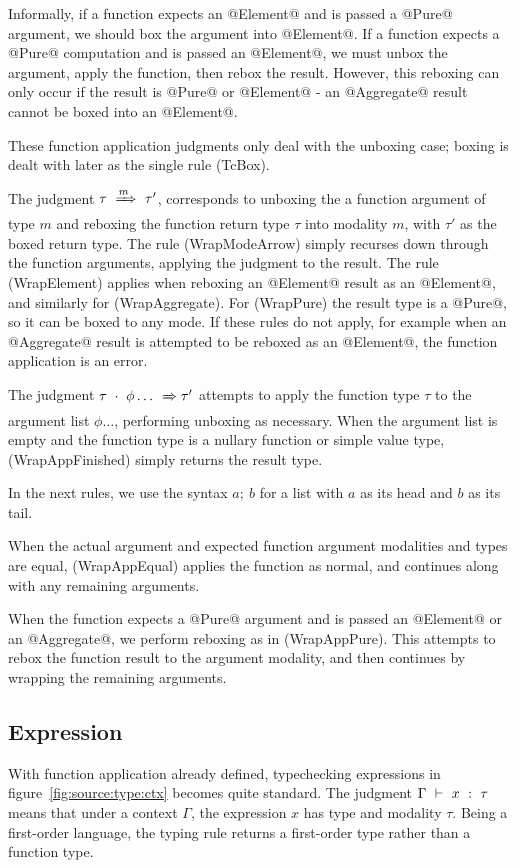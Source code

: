 Informally, if a function expects an @Element@ and is passed a @Pure@ argument, we should box the argument into @Element@.
If a function expects a @Pure@ computation and is passed an @Element@, we must unbox the argument, apply the function, then rebox the result.
However, this reboxing can only occur if the result is @Pure@ or @Element@ - an @Aggregate@ result cannot be boxed into an @Element@.

These function application judgments only deal with the unboxing case; boxing is dealt with later as the single rule (TcBox).

The judgment $\tau ~\xRightarrow{m}~ \tau'$, corresponds to unboxing the a function argument of type $m$ and reboxing the function return type $\tau$ into modality $m$, with $\tau'$ as the boxed return type.
The rule (WrapModeArrow) simply recurses down through the function arguments, applying the judgment to the result.
The rule (WrapElement) applies when reboxing an @Element@ result as an @Element@, and similarly for (WrapAggregate).
For (WrapPure) the result type is a @Pure@, so it can be boxed to any mode.
If these rules do not apply, for example when an @Aggregate@ result is attempted to be reboxed as an @Element@, the function application is an error.

The judgment $\tau~\cdot~\phi\ldots ~\xRightarrow~ \tau'$ attempts to apply the function type $\tau$ to the argument list $\phi\ldots$, performing unboxing as necessary.
When the argument list is empty and the function type is a nullary function or simple value type, (WrapAppFinished) simply returns the result type.

In the next rules, we use the syntax $a;~b$ for a list with $a$ as its head and $b$ as its tail.

When the actual argument and expected function argument modalities and types are equal, (WrapAppEqual) applies the function as normal, and continues along with any remaining arguments.

When the function expects a @Pure@ argument and is passed an @Element@ or an @Aggregate@, we perform reboxing as in (WrapAppPure).
This attempts to rebox the function result to the argument modality, and then continues by wrapping the remaining arguments.



\subsection{Expression}
With function application already defined, typechecking expressions in figure~\ref{fig:source:type:ctx} becomes quite standard.
The judgment $\Gamma ~\vdash~ x ~:~ \tau$ means that under a context $\Gamma$, the expression $x$ has type and modality $\tau$.
Being a first-order language, the typing rule returns a first-order type rather than a function type.

